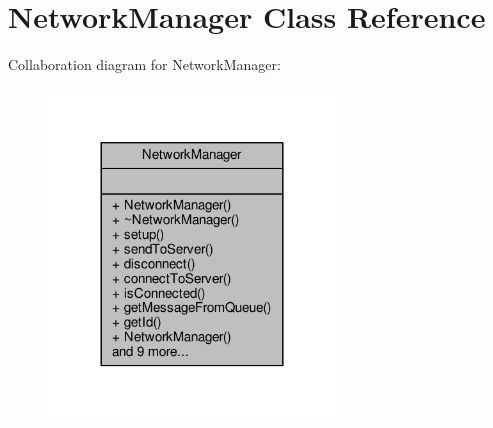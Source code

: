 \hypertarget{class_network_manager}{}\section{Network\+Manager Class Reference}
\label{class_network_manager}


Collaboration diagram for Network\+Manager\+:\nopagebreak
\begin{figure}[H]
\begin{center}
\leavevmode
\includegraphics[width=216pt]{df/d5a/class_network_manager__coll__graph}
\end{center}
\end{figure}
